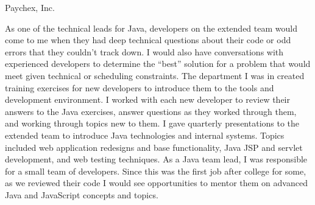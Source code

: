 \documentclass[MMMMyyyy,nonstopmode]{simpleresumecv_stacked}
\begin{document}
\begin{Body}
Paychex, Inc.
\begin{Detail}
\BulletItem
As one of the technical leads for Java, developers on the extended team would come to me when they had deep technical questions about their code or odd errors that they couldn't track down. I would also have conversations with experienced developers to determine the ``best'' solution for a problem that would meet given technical or scheduling constraints.
\BulletItem
The department I was in created training exercises for new developers to introduce them to the tools and development environment. I worked with each new developer to review their answers to the Java exercises,  answer questions as they worked through them, and working through topics new to them.
\BulletItem
I gave quarterly presentations to the extended team to introduce Java technologies and internal systems. Topics included web application redesigns and base functionality, Java JSP and servlet development, and web testing techniques.
\BulletItem
As a Java team lead, I was responsible for a small team of developers. Since this was the first job after college for some, as we reviewed their code I would see opportunities to mentor them on advanced Java and JavaScript concepts and topics.
\end{Detail}
\fi      %

\fi %

\iffalse %

\Section
{Awards}
{Awards}
{PDF:Awards}
\textbf{Paychex Paragon Award for Resiliency}
\hfill
\DatestampY{2019}
\begin{Detail}
Our project, "Adaptive Load Balancing", was chosen for this annual award. 
It routes requests in F5 BigIP GTM and LTMs across servers and data centers based on server load, real-time statistics, and other measures to reduce outages and improve response times for services.
\end{Detail}
\BigGap

\textbf{AppDynamics Scale Award}
\hfill
\DatestampY{2015}

Awarded for successfully deploying AppDynamics to over 20,000 JBoss, WebLogic, and Windows IIS servers across our fleet in our first year.
\fi %


\end{Body}
\end{document}
